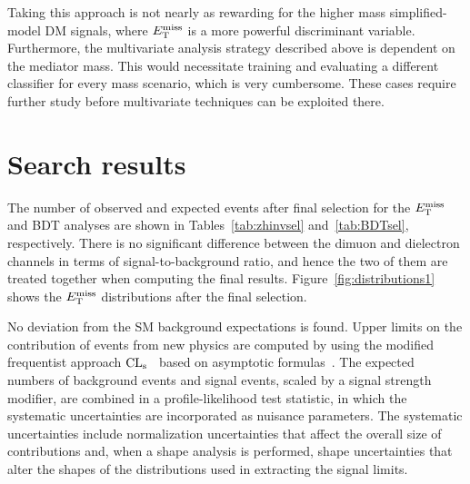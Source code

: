 Taking this approach is not nearly as rewarding for the higher mass simplified-model DM signals, where $E_\mathrm{T}^{\mathrm{miss}}$ is a more powerful discriminant variable.
Furthermore, the multivariate analysis strategy described above is dependent on the mediator mass.
This would necessitate training and evaluating a different classifier for every mass scenario, which is very cumbersome.
These cases require further study before multivariate techniques can be exploited there.

\section{Search results}
\label{sec:dmresults}
The number of observed and expected events after final selection for the $E_\mathrm{T}^{\mathrm{miss}}$ and BDT analyses are shown in Tables~\ref{tab:zhinvsel} and~\ref{tab:BDTsel}, respectively. 
There is no significant difference between the dimuon and dielectron channels 
in terms of signal-to-background ratio, and hence the two of them 
are treated together when computing the final results. 
Figure~\ref{fig:distributions1} shows the $E_\mathrm{T}^{\mathrm{miss}}$
distributions after the final selection.

No deviation from the SM background expectations is found.
Upper limits on the contribution of events from new physics are
computed by using the modified frequentist approach
$\text{CL}_\text{s}$~\cite{Read1,junkcls} based on asymptotic
formulas~\cite{Cowan:2010js}. 
The expected numbers of background events and signal events, scaled by
a signal strength modifier, are combined in a profile-likelihood test 
statistic, in which the systematic uncertainties are incorporated as
nuisance parameters. 
The systematic uncertainties include normalization uncertainties that
affect the overall size of contributions and, when a shape analysis is
performed, shape uncertainties that alter the shapes of the
distributions used in extracting the signal limits. 


